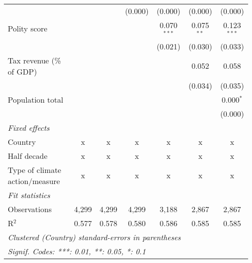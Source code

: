 \begin{tabular}{lcccccc}
                                                                                           &         &                & (0.000)        & (0.000)        & (0.000)        & (0.000)\\   
   Polity score                                                                            &         &                &                & 0.070$^{***}$  & 0.075$^{**}$   & 0.123$^{***}$\\   
                                                                                           &         &                &                & (0.021)        & (0.030)        & (0.033)\\   
   Tax revenue (\% of GDP)                                                                 &         &                &                &                & 0.052          & 0.058\\   
                                                                                           &         &                &                &                & (0.034)        & (0.035)\\   
   Population total                                                                        &         &                &                &                &                & 0.000$^{*}$\\   
                                                                                           &         &                &                &                &                & (0.000)\\   
   \emph{Fixed effects}\\
   Country                                                                                 & x       & x              & x              & x              & x              & x\\  
   Half decade                                                                             & x       & x              & x              & x              & x              & x\\  
   Type of climate action/measure                                                          & x       & x              & x              & x              & x              & x\\  
   \midrule \emph{Fit statistics}\\
   Observations                                                                            & 4,299   & 4,299          & 4,299          & 3,188          & 2,867          & 2,867\\  
   R$^2$                                                                                   & 0.577   & 0.578          & 0.580          & 0.586          & 0.585          & 0.585\\  
   \midrule
   \multicolumn{7}{l}{\emph{Clustered (Country) standard-errors in parentheses}}\\
   \multicolumn{7}{l}{\emph{Signif. Codes: ***: 0.01, **: 0.05, *: 0.1}}\\
\end{tabular}
\par\endgroup


